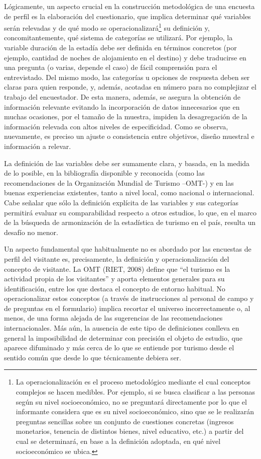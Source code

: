 \documentclass[
]{book}
\begin{document}
Lógicamente, un aspecto crucial en la construcción metodológica de una encuesta de perfil es la elaboración del cuestionario, que implica determinar qué variables serán relevadas y de qué modo se operacionalizará\footnote{La operacionalización es el proceso metodológico mediante el cual conceptos complejos se hacen medibles. Por ejemplo, si se busca clasificar a las personas según su nivel socioeconómico, no se preguntará directamente por lo que el informante considera que es su nivel socioeconómico, sino que se le realizarán preguntas sencillas sobre un conjunto de cuestiones concretas (ingresos monetarios, tenencia de distintos bienes, nivel educativo, etc.) a partir del cual se determinará, en base a la definición adoptada, en qué nivel socioeconómico se ubica.} su definición y, concomitantemente, qué sistema de categorías se utilizará. Por ejemplo, la variable duración de la estadía debe ser definida en términos concretos (por ejemplo, cantidad de noches de alojamiento en el destino) y debe traducirse en una pregunta (o varias, depende el caso) de fácil comprensión para el entrevistado. Del mismo modo, las categorías u opciones de respuesta deben ser claras para quien responde, y, además, acotadas en número para no complejizar el trabajo del encuestador. De esta manera, además, se asegura la obtención de información relevante evitando la incorporación de datos innecesarios que en muchas ocasiones, por el tamaño de la muestra, impiden la desagregación de la información relevada con altos niveles de especificidad. Como se observa, nuevamente, es preciso un ajuste o consistencia entre objetivos, diseño muestral e información a relevar.

La definición de las variables debe ser sumamente clara, y basada, en la medida de lo posible, en la bibliografía disponible y reconocida (como las recomendaciones de la Organización Mundial de Turismo --OMT-) y en las buenas experiencias existentes, tanto a nivel local, como nacional o internacional. Cabe señalar que sólo la definición explícita de las variables y sus categorías permitirá evaluar su comparabilidad respecto a otros estudios, lo que, en el marco de la búsqueda de armonización de la estadística de turismo en el país, resulta un desafío no menor.

Un aspecto fundamental que habitualmente no es abordado por las encuestas de perfil del visitante es, precisamente, la definición y operacionalización del concepto de visitante. La OMT (RIET, 2008) define que ``el turismo es la actividad propia de los visitantes'' y aporta elementos generales para su identificación, entre los que destaca el concepto de entorno habitual. No operacionalizar estos conceptos (a través de instrucciones al personal de campo y de preguntas en el formulario) implica recortar el universo incorrectamente o, al menos, de una forma alejada de las sugerencias de las recomendaciones internacionales. Más aún, la ausencia de este tipo de definiciones conlleva en general la imposibilidad de determinar con precisión el objeto de estudio, que aparece difuminado y más cerca de lo que se entiende por turismo desde el sentido común que desde lo que técnicamente debiera ser.
\end{document}
